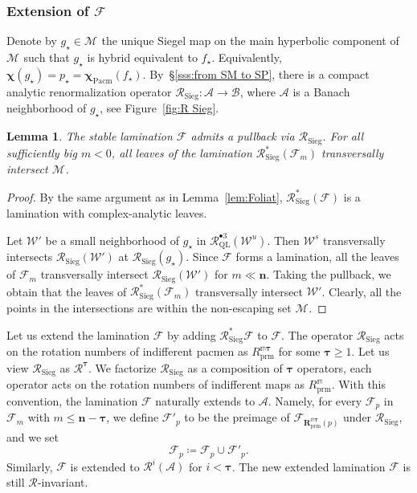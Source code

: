 \documentclass{amsart}
\newcommand{\1}{{\mathbb 1 }}
\newcommand\MM{\mathscr{M}}
\newcommand\RR{\mathcal{R}}
\newcommand\prm{{\operatorname{prm}}}
\newcommand\cRRc{R_{\prm}}%
\newcommand\mRRc{ \boldsymbol R_{\prm}}%
\newcommand{\bbn}{{\mathbf n}}
\newcommand{\btau}{{ \boldsymbol {\tau}}}%
\newcommand{\str}{{\star}}
\newcommand{\mm}{\mathbb{m}}
\newcommand\strai{{\boldsymbol \chi}}
\newcommand\WW{\mathcal{W}}
\newcommand\BB{\mathcal{B}}
\renewcommand\AA{\mathcal{A}}
\newcommand\cp{{}}%
\newcommand\Sieg{{\operatorname{Sieg}}}
\newcommand\Pacm{{\operatorname{Pacm}}}
\newcommand{\Fol}{{\mathcal F}}
\newcommand{\bFol}{{\boldsymbol{ \mathcal F}}}
\newtheorem{lem}[thm]{Lemma}
\theoremstyle{remark}
\numberwithin{equation}{section}
\theoremstyle{definition}
\def\QL{{\text{QL}}}
\theoremstyle{nonumberbreak}
\begin{document}
\subsubsection{Extension of $\bFol$}
Denote by $g_\str\in \MM_\cp$ the unique Siegel map on the main hyperbolic component of $\MM_\cp$ such that $g_\str$ is hybrid equivalent to $f_\str$. Equivalently, $\strai(g_\str)=p_\str=\strai_\Pacm(f_\str)$. By~\S\ref{sss:from SM to SP}, there is a compact analytic renormalization operator $\RR_{\Sieg}\colon \AA\to \BB$, where $\AA$ is a Banach neighborhood of $g_\str$, see Figure~\ref{fig:R Sieg}. 
 



\begin{lem}
The stable lamination $\bFol$ admits a pullback via $\RR_\Sieg$. For all sufficiently big $m<0$, all leaves of the lamination $\RR_\Sieg^*( \bFol_m)$  transversally intersect $\MM_\cp$.
\end{lem}
\begin{proof}
By the same argument as in Lemma~\ref{lem:Foliat}, $\RR_\Sieg^*(\bFol)$ is a lamination with complex-analytic leaves. 

Let $\WW'$ be a small neighborhood of $g_\str$ in $\RR_\QL^{\bullet 3}(\WW^u)$. Then $\WW^s$ transversally intersects $\RR_{\Sieg} (\WW')$ at $\RR_{\Sieg}  (g_\str)$. Since $\bFol$ forms a lamination, all the leaves of $\bFol_m$ transversally intersect $\RR_{\Sieg} (\WW')$ for $m\ll \bbn$. Taking the pullback, we obtain that the leaves of $\RR_\Sieg^*( \bFol_m)$ transversally intersect $\WW'$. Clearly, all the points in the intersections are within the non-escaping set $\MM_\cp$. 
\end{proof}

Let us extend the lamination $\bFol$ by adding $\RR_\Sieg^*  \bFol$ to $\bFol$. The operator $\RR_{\Sieg}$ acts on the rotation numbers of indifferent pacmen as  $\cRRc^{\mm\btau}$ for some $\btau\ge 1$. Let us view $\RR_{\Sieg}$ as $\RR^\btau$. We factorize $\RR_\Sieg$ as a composition of $\btau$ operators, each operator acts on the rotation numbers of indifferent maps as  $\cRRc^{\mm}$. With this convention, the lamination $\bFol$ naturally extends to $\AA$. Namely, for every $\Fol_{p}$ in $\bFol_{m}$ with $m\le \bbn-\btau$, we define $\Fol'_p$ to be the preimage of $\Fol_{\mRRc^{\mm\btau}(p)}$ under $\RR_{\Sieg}$, and we set 
\begin{equation}
\label{eq:fol:ext}
\Fol_p\coloneqq \Fol_p\cup \Fol'_p.
\end{equation}
Similarly, $\bFol$ is extended to $\RR^i(\AA)$ for $i<\btau$. The new extended lamination $\bFol$ is still $\RR$-invariant.
\end{document}
